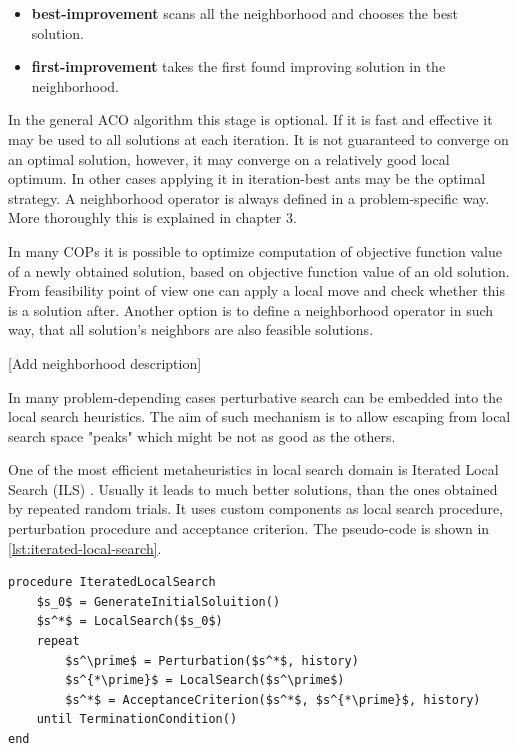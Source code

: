 \documentclass[11pt,a4paper,oneside]{book}
\begin{document}
\begin{itemize}
\item \textbf{best-improvement} scans all the neighborhood and chooses the best solution.
\item \textbf{first-improvement} takes the first found improving solution in the neighborhood.
\end{itemize}


In the general ACO algorithm this stage is optional. If it is fast and effective it may be used to all solutions at each iteration. It is not guaranteed to converge on an optimal solution, however, it may converge on a relatively good local optimum. In other cases applying it in iteration-best ants may be the optimal strategy. A neighborhood operator is always defined in a problem-specific way. More thoroughly this is explained in chapter 3.

In many COPs it is possible to optimize computation of objective function value of a newly obtained solution, based on objective function value of an old solution. From feasibility point of view one can apply a local move and check whether this is a solution after. Another option is to define a neighborhood operator in such way, that all solution's neighbors are also feasible solutions.

[Add neighborhood description]

In many problem-depending cases perturbative search can be embedded into the local search heuristics. The aim of such mechanism is to allow escaping from local search space "peaks" which might be not as good as the others.

One of the most efficient metaheuristics in local search domain is Iterated Local Search (ILS) \cite{STUTZLE2001ILS}. Usually it leads to much better solutions, than the ones obtained by repeated random trials. It uses custom components as local search procedure, perturbation procedure and acceptance criterion. The pseudo-code is shown in \ref{lst:iterated-local-search}.


\begin{minipage}[c, breaklines=true]{0.95\textwidth}
\begin{lstlisting}[caption={Iterated Local Search pseudo-code}, label={lst:iterated-local-search}, mathescape=true]
procedure IteratedLocalSearch
	$s_0$ = GenerateInitialSoluition()
	$s^*$ = LocalSearch($s_0$)
	repeat
		$s^\prime$ = Perturbation($s^*$, history)
		$s^{*\prime}$ = LocalSearch($s^\prime$)
		$s^*$ = AcceptanceCriterion($s^*$, $s^{*\prime}$, history)
	until TerminationCondition()
end
\end{lstlisting}
\end{minipage}
\end{document}
